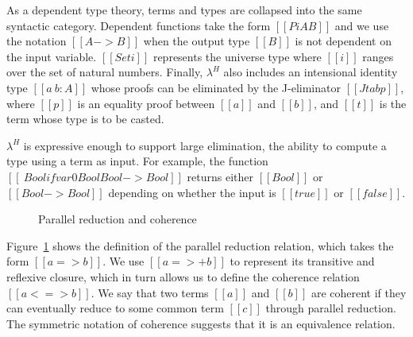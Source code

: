 \documentclass[acmsmall]{acmart}
\newcommand{\lang}{$\lambda^H$\xspace}
\begin{document}

As a
dependent type theory, terms and types are collapsed into the same
syntactic category. Dependent functions take the form $[[Pi A B]]$ and
we use the notation $[[A -> B]]$ when the output type $[[B]]$ is not
dependent on the input variable. $[[Set i]]$ represents the universe
type where $[[i]]$ ranges over the set of natural numbers.
 Finally,
\lang also includes an intensional identity type $[[a ~ b : A]]$ whose
proofs can be eliminated by the J-eliminator $[[J t a b p]]$, where
$[[p]]$ is an equality proof between $[[a]]$ and $[[b]]$, and $[[t]]$
is the term whose type is to be casted.

\lang is expressive enough to support large
elimination, the ability to compute a type using a term as input. For
example, the function $[[\ Bool if var 0 Bool Bool -> Bool]]$ returns
either $[[Bool]]$ or $[[Bool -> Bool]]$ depending on whether the input
is $[[true]]$ or $[[false]]$.

\begin{figure}[h]
\begin{minipage}{0.9\textwidth}
\end{minipage}
\caption{Parallel reduction and coherence}
\label{fig:par}
\end{figure}

Figure~\ref{fig:par} shows the definition of the parallel reduction
relation, which takes the form $[[a => b]]$. We use $[[a =>+ b]]$ to
represent its transitive and reflexive closure, which in turn allows us to define
the coherence relation $[[a <=> b]]$.
We say that two terms $[[a]]$
and $[[b]]$ are coherent if they can eventually reduce to some common
term $[[c]]$ through parallel reduction. The symmetric notation of
coherence suggests that it is an equivalence relation.
\end{document}
